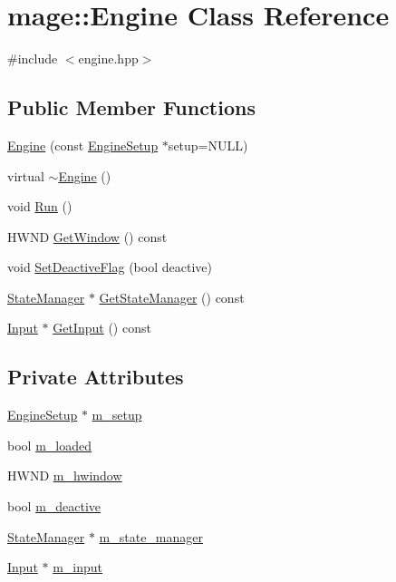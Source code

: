 \hypertarget{classmage_1_1_engine}{}\section{mage\+:\+:Engine Class Reference}
\label{classmage_1_1_engine}


{\ttfamily \#include $<$engine.\+hpp$>$}

\subsection*{Public Member Functions}
\begin{DoxyCompactItemize}
\item 
\hyperlink{classmage_1_1_engine_a5b49f3adf1dd889bb38f5325fd6db317}{Engine} (const \hyperlink{structmage_1_1_engine_setup}{Engine\+Setup} $\ast$setup=N\+U\+LL)
\item 
virtual \hyperlink{classmage_1_1_engine_a34628556f8397d70ed018d71e343c2f5}{$\sim$\+Engine} ()
\item 
void \hyperlink{classmage_1_1_engine_afdc05e214d3f47a6ea3a40dfffd86f80}{Run} ()
\item 
H\+W\+ND \hyperlink{classmage_1_1_engine_a1c5f9d8c68045b36f404251359aa41e4}{Get\+Window} () const
\item 
void \hyperlink{classmage_1_1_engine_a942bfa9892fa79bb1068d7c7ec4e6732}{Set\+Deactive\+Flag} (bool deactive)
\item 
\hyperlink{classmage_1_1_state_manager}{State\+Manager} $\ast$ \hyperlink{classmage_1_1_engine_a4f35bccc3784de531245a2549d537745}{Get\+State\+Manager} () const
\item 
\hyperlink{classmage_1_1_input}{Input} $\ast$ \hyperlink{classmage_1_1_engine_a55d099d040e8895803f15e214f3b6d9e}{Get\+Input} () const
\end{DoxyCompactItemize}
\subsection*{Private Attributes}
\begin{DoxyCompactItemize}
\item 
\hyperlink{structmage_1_1_engine_setup}{Engine\+Setup} $\ast$ \hyperlink{classmage_1_1_engine_a825715684015ac2a43cfc5b6bf3b083f}{m\+\_\+setup}
\item 
bool \hyperlink{classmage_1_1_engine_a2f8783761b9629dd507d0a6bc456125b}{m\+\_\+loaded}
\item 
H\+W\+ND \hyperlink{classmage_1_1_engine_a1dda09f0ed656180f926616a0d3f95f1}{m\+\_\+hwindow}
\item 
bool \hyperlink{classmage_1_1_engine_ab8a4b0157403708ae7d1d018a95b4c63}{m\+\_\+deactive}
\item 
\hyperlink{classmage_1_1_state_manager}{State\+Manager} $\ast$ \hyperlink{classmage_1_1_engine_a7a0c463c67c3375b896809be9046113d}{m\+\_\+state\+\_\+manager}
\item 
\hyperlink{classmage_1_1_input}{Input} $\ast$ \hyperlink{classmage_1_1_engine_a432ac639c593fd0fb8cede2463fe10c2}{m\+\_\+input}
\end{DoxyCompactItemize}


